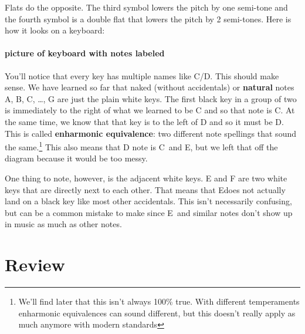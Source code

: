 \documentclass[../OpenAppliedMusicTheory.tex]{subfiles}
\begin{document}
        Flats do the opposite. The third symbol lowers the pitch by one semi-tone and the fourth symbol is a double flat that lowers the pitch by 2 semi-tones. Here is how it looks on a keyboard:

        \paragraph{picture of keyboard with notes labeled}
        You'll notice that every key has multiple names like C\sh/D\fl. This should make sense. We have learned so far that naked (without accidentals) or \textbf{natural} notes A, B, C, \dots, G are just the plain white keys. The first black key in a group of two is immediately to the right of what we learned to be C and so that note is C\sh. At the same time, we know that that key is to the left of D and so it must be D\fl. This is called \textbf{enharmonic equivalence}: two different note spellings that sound the same.\footnote{We'll find later that this isn't always 100\% true. %
        With different temperaments enharmonic equivalences can sound different, but this doesn't really apply as much anymore with modern standards }
        This also means that D note is C\musDoubleSharp\ and E\musDoubleFlat, but we left that off the diagram because it would be too messy.

        One thing to note, however, is the adjacent white keys. E and F are two white keys that are directly next to each other. That means that E\sh does not actually land on a black key like most other accidentals. This isn't necessarily confusing, but can be a common mistake to make since E\sh\ and similar notes don't show up in music as much as other notes.

    \section{Review}
        
\end{document}
